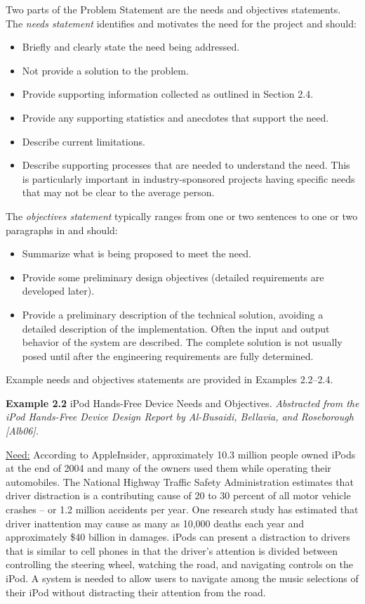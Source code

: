 Two parts of the Problem Statement are the needs and objectives
statements. The \emph{needs statement} identifies and motivates the need
for the project and should:

\begin{itemize}
\item
  Briefly and clearly state the need being addressed.
\item
  Not provide a solution to the problem.
\item
  Provide supporting information collected as outlined in Section 2.4.
\item
  Provide any supporting statistics and anecdotes that support the need.
\item
  Describe current limitations.
\item
  Describe supporting processes that are needed to understand the need.
  This is particularly important in industry-sponsored projects having
  specific needs that may not be clear to the average person.
\end{itemize}

The \emph{objectives statement} typically ranges from one or two
sentences to one or two paragraphs in and should:

\begin{itemize}
\item
  Summarize what is being proposed to meet the need.
\item
  Provide some preliminary design objectives (detailed requirements are
  developed later).
\item
  Provide a preliminary description of the technical solution, avoiding
  a detailed description of the implementation. Often the input and
  output behavior of the system are described. The complete solution is
  not usually posed until after the engineering requirements are fully
  determined.
\end{itemize}

Example needs and objectives statements are provided in Examples
2.2--2.4.

\textbf{Example 2.2} iPod Hands-Free Device Needs and Objectives.
\emph{Abstracted from the iPod Hands-Free Device Design Report by
Al-Busaidi, Bellavia, and Roseborough {[}Alb06{]}.}

\ul{Need:} According to AppleInsider, approximately 10.3 million people
owned iPods at the end of 2004 and many of the owners used them while
operating their automobiles. The National Highway Traffic Safety
Administration estimates that driver distraction is a contributing cause
of 20 to 30 percent of all motor vehicle crashes -- or 1.2 million
accidents per year. One research study has estimated that driver
inattention may cause as many as 10,000 deaths each year and
approximately \$40 billion in damages. iPods can present a distraction
to drivers that is similar to cell phones in that the driver's attention
is divided between controlling the steering wheel, watching the road,
and navigating controls on the iPod. A system is needed to allow users
to navigate among the music selections of their iPod without distracting
their attention from the road.

